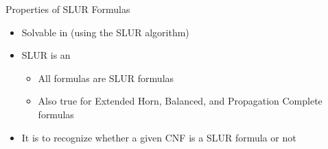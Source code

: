 \documentclass[t]{sdqbeamer}
\begin{document}
\begin{frame}{Properties of SLUR Formulas}
	\begin{itemize}\setlength{\itemsep}{1ex}
		\item Solvable in  (using the SLUR algorithm)
		\item SLUR is an 
		\begin{itemize}
			\item All  formulas are SLUR formulas
			\item Also true for Extended Horn, Balanced, and Propagation Complete formulas
		\end{itemize}
		\item It is  to recognize whether a given CNF is a SLUR formula or not
	\end{itemize}
\end{frame}

\end{document}

